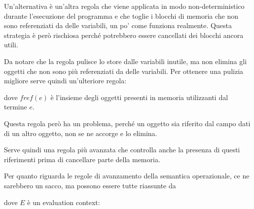 \begin{prooftree}
\end{prooftree}

\noindent Un'alternativa è un'altra regola che viene applicata in modo non-deterministico durante l'esecuzione del programma e che toglie i blocchi di memoria che non sono referenziati da delle variabili, un po' come funziona realmente. Questa strategia è però rischiosa perché potrebbero essere cancellati dei blocchi ancora utili.

Da notare che la regola  pulisce lo store dalle variabili inutile, ma non elimina gli oggetti che non sono più referenziati da delle variabili. Per ottenere una pulizia migliore serve quindi un'ulteriore regola:

\begin{prooftree}
\end{prooftree}

\noindent dove $fref(e)$ è l'insieme degli oggetti presenti in memoria utilizzanti dal termine $e$. 

Questa regola però ha un problema, perché un oggetto sia riferito dal campo dati di un altro oggetto, non se ne accorge e lo elimina.

Serve quindi una regola più avanzata che controlla anche la presenza di questi riferimenti prima di cancellare parte della memoria.

\begin{prooftree}
\end{prooftree}

\noindent Per quanto riguarda le regole di avanzamento della semantica operazionale, ce ne sarebbero un sacco, ma possono essere tutte riassunte da

\begin{prooftree}
\end{prooftree}

\noindent dove $E$ è un evaluation context:


